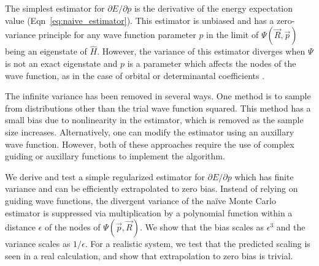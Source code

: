 \documentclass[twocolumn]{revtex4-1}
\begin{document}
The simplest estimator for $\partial E/\partial p$ is the derivative of the energy expectation value (Eqn~\ref{eq:naive_estimator}).
This estimator is unbiased and has a zero-variance principle for any wave function parameter $p$ in the limit of $\Psi(\vec{R}, \vec{p})$ being an eigenstate of $\hat{H}$.
However, the variance of this estimator diverges when $\Psi$ is not an exact eigenstate and $p$ is a parameter which affects the nodes of the wave function, as in the case of orbital or determinantal coefficients \cite{Avella, doi:10.1063/1.4933112}.

The infinite variance has been removed in several ways. 
One method is to sample from distributions other than the trial wave function squared.\cite{Avella, Attaccalite2008, Zen2013} 
This method has a small bias\cite{doi:10.1063/1.4933112} due to nonlinearity in the estimator, which is removed as the sample size increases.
Alternatively, one can modify the estimator using an auxillary wave function.\cite{Assaraf1999, doi:10.1063/1.1286598, Assaraf2003}
However, both of these approaches require the use of complex guiding or auxillary functions to implement the algorithm.

We derive and test a simple regularized estimator for $\partial E/\partial p$ which has finite variance and can be efficiently extrapolated to zero bias.
Instead of relying on guiding wave functions, the divergent variance of the na\"ive Monte Carlo estimator is suppressed via multiplication by a polynomial function within a distance $\epsilon$ of the nodes of $\Psi(\vec{p}, \vec{R})$. 
We show that the bias scales as $\epsilon^3$ and the variance scales as $1/\epsilon$. 
For a realistic system, we test that the predicted scaling is seen in a real calculation, and show that extrapolation to zero bias is trivial.
\end{document}
